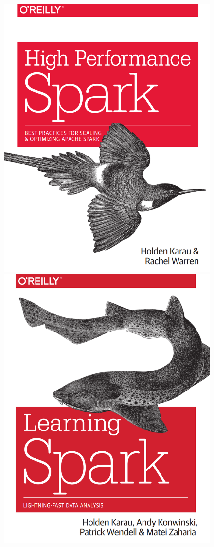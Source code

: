 \begin{frame}[c]
\begin{figure}[ht]
\begin{minipage}[c][1\width]{0.3\textwidth}
		\includegraphics[width=.9\linewidth,height=.7\textheight]{./Figures/chapter-00/spark-high-performance.png}
	\end{minipage}
\hfill
	\begin{minipage}[c][1\width]{0.3\textwidth}
	\centering
	\includegraphics[width=.9\linewidth,height=.7\textheight]{./Figures/chapter-00/learning_spark_front.png}
\end{minipage}


\end{figure}
\end{frame}
